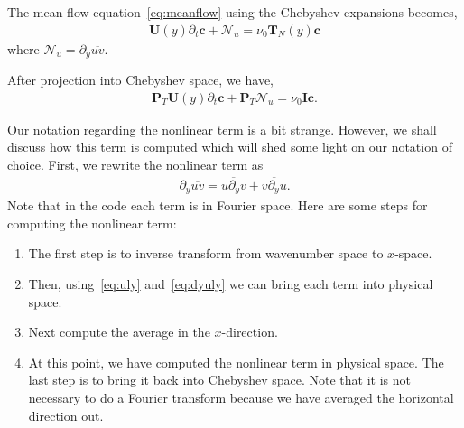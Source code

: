 \documentclass[12pt]{article}
\newcommand{\lr}[1]{\left(#1\right)}
\newcommand{\wh}[1]{\widehat{#1}}
\begin{document}
    The mean flow equation~\eqref{eq:meanflow} using the Chebyshev expansions becomes,
    \begin{align}
      \mathbf{U}\lr{y}\partial_{t}\mathbf{c} + \mathcal{N}_{u} = \nu_{0}\mathbf{T}_N\lr{y}\mathbf{c}
    \end{align} 
    where  $\mathcal{N}_{u} = \partial_{y}\overline{uv}$.
    
    After projection into Chebyshev space, we have,
    \begin{align}
      \mathbf{P}_{T}\mathbf{U}\lr{y}\partial_{t}\mathbf{c} + \mathbf{P}_{T}\mathcal{N}_{u} = 
      \nu_{0}\mathbf{I}\mathbf{c} .
    \end{align}

    Our notation regarding the nonlinear term is a bit strange.  However, we shall discuss
    how this term is computed which will shed some light on our notation of choice.  First, 
    we rewrite the nonlinear term as 
    \begin{align}
      \partial_{y}\overline{uv} = \overline{u\partial_{y}v} + \overline{v\partial_{y}u}.
    \end{align}
    Note that in the code each term is in Fourier space.  Here are some steps for computing the 
    nonlinear term:
    \begin{enumerate}
      \item The first step is to inverse transform from wavenumber space to $x$-space.  
      \item Then, using~\eqref{eq:uly} and~\eqref{eq:dyuly} we can bring each term into physical space.  
      \item Next compute the average in the $x$-direction.  
      \item At this point, we have computed the nonlinear term in physical space.  The last step is to 
            bring it back into Chebyshev space.  Note that it is not necessary to do a Fourier transform 
            because we have averaged the horizontal direction out.
    \end{enumerate}

\end{document}
